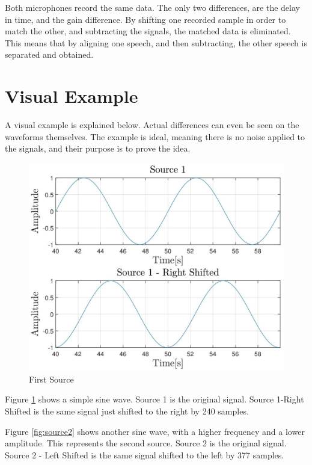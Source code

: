 
Both microphones record the same data. The only two differences, are the delay in time,
and the gain difference. By shifting one recorded sample in order to match the other,
and subtracting the signals, the matched data is eliminated. This means that by aligning 
one speech, and then subtracting, the other speech is separated and obtained.

\newpage

\section{Visual Example}
A visual example is explained below. Actual differences can even be seen on the waveforms themselves.
The example is ideal, meaning there is no noise applied to the signals, and their purpose is to 
prove the idea.

\begin{figure}[htp]
	\centering
	\includegraphics[width=\textwidth]{Illustrations/source1.jpg}
	\caption{First Source}
	\label{fig:source1}
\end{figure}

Figure \ref{fig:source1} shows a simple sine wave. Source 1 is the original signal. Source 1-Right Shifted
is the same signal just shifted to the right by 240 samples.

\newpage

Figure \ref{fig:source2} shows another sine wave, with a higher frequency and a lower amplitude. This 
represents the second source. Source 2 is the original signal. Source 2 - Left Shifted is the same signal
shifted to the left by 377 samples.



